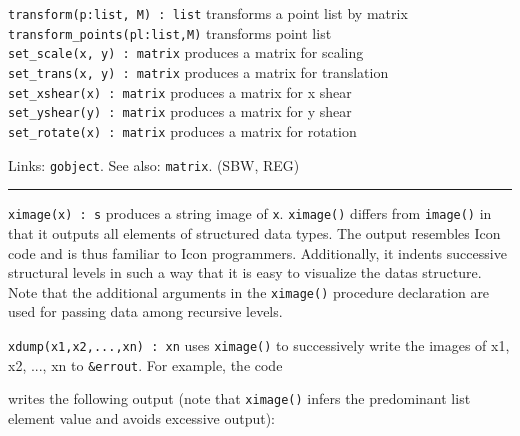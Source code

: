 \texttt{transform(p:list, M) : list} transforms a point list by
matrix\\
\texttt{transform\_points(pl:list,M)} transforms point list\\
\texttt{set\_scale(x, y) : matrix} produces a matrix for scaling\\
\texttt{set\_trans(x, y) : matrix} produces a matrix for
translation\\
\texttt{set\_xshear(x) : matrix} produces a matrix for x shear\\
\texttt{set\_yshear(y) : matrix} produces a matrix for y shear\\
\texttt{set\_rotate(x) : matrix} produces a matrix for rotation

Links: \texttt{gobject}. See also: \texttt{matrix}. (SBW, REG)

\vspace{0.25cm}\hrule{}

\texttt{ximage(x) : s} produces a string image of \texttt{x}.
\texttt{ximage()} differs from \texttt{image()} in that it outputs all
elements of structured data types. The output
resembles Icon code and is thus familiar to Icon programmers.
Additionally, it indents successive structural levels in such a way
that it is easy to visualize the data{\textquotesingle}s structure.
Note that the additional arguments in the \texttt{ximage()} procedure
declaration are used for passing data among recursive levels. 

\texttt{xdump(x1,x2,...,xn) : xn} uses \texttt{ximage()} to successively
write the images of x1, x2, ..., xn to \texttt{\&errout}. For example,
the code


writes the following output (note that \texttt{ximage()} infers the
predominant list element value and avoids excessive output):



